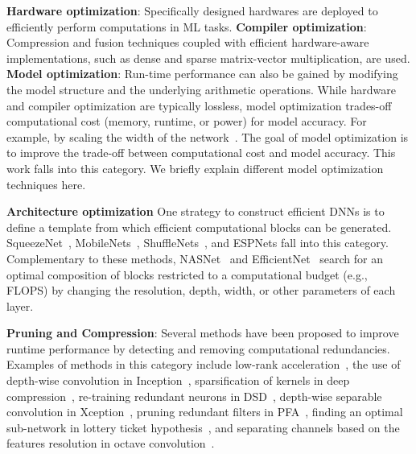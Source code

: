 \documentclass[10pt,twocolumn,letterpaper]{article}
\begin{document}
{\bf Hardware optimization}: Specifically designed hardwares are deployed to efficiently perform computations in ML tasks.
{\bf Compiler optimization}: Compression and fusion techniques coupled with efficient hardware-aware implementations, such as dense and sparse matrix-vector multiplication, are used.
{\bf Model optimization}: 
Run-time performance can also be gained by modifying the model structure and the underlying arithmetic operations. While hardware and compiler optimization are typically lossless, model optimization trades-off computational cost (memory, runtime, or power) for model accuracy. For example, by scaling the width of the network~\cite{zagoruyko2016wide}. The goal of model optimization is to improve the trade-off between computational cost and model accuracy. This work falls into this category. We briefly explain different model optimization techniques here.

{\bf Architecture optimization}
One strategy to construct efficient DNNs is to define a template from which efficient computational blocks can be generated. SqueezeNet~\cite{iandola2016squeezenet}, MobileNets~\cite{howard2017mobilenets,sandler2018mobilenetv2},  ShuffleNets~\cite{ma2018shufflenet,zhang2018shufflenet}, and ESPNets \cite{mehta2018espnet,mehta2019espnetv2} fall into this category. 
Complementary to these methods, NASNet~\cite{zoph2018learning} and EfficientNet~\cite{tan2019efficientnet} search for an  optimal composition of blocks restricted to a computational budget (e.g., FLOPS) by changing the resolution, depth, width, or other parameters of each layer.

{\bf Pruning and Compression}:
Several methods have been proposed to improve runtime performance by detecting and removing computational redundancies. Examples of methods in this category include low-rank acceleration~\cite{jaderberg2014speeding}, the use of depth-wise convolution in Inception~\cite{szegedy2015going}, sparsification of kernels in deep compression~\cite{han2015deep}, re-training redundant neurons in DSD~\cite{han2016dsd}, depth-wise separable convolution in Xception~\cite{chollet2017xception}, pruning redundant filters in PFA~\cite{suau2018network}, finding an optimal sub-network in lottery ticket hypothesis~\cite{frankle2018lottery}, and separating channels based on the features resolution in octave convolution~\cite{chen2019drop}.
\end{document}
